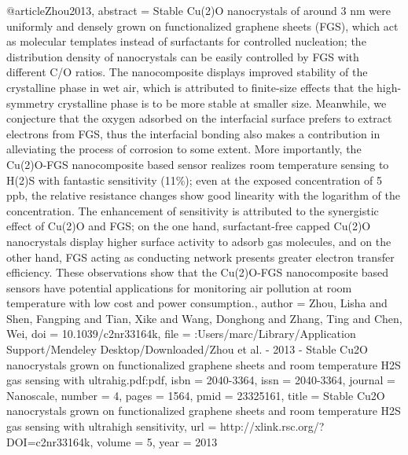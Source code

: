 @article{Zhou2013,
abstract = {Stable Cu(2)O nanocrystals of around 3 nm were uniformly and densely grown on functionalized graphene sheets (FGS), which act as molecular templates instead of surfactants for controlled nucleation; the distribution density of nanocrystals can be easily controlled by FGS with different C/O ratios. The nanocomposite displays improved stability of the crystalline phase in wet air, which is attributed to finite-size effects that the high-symmetry crystalline phase is to be more stable at smaller size. Meanwhile, we conjecture that the oxygen adsorbed on the interfacial surface prefers to extract electrons from FGS, thus the interfacial bonding also makes a contribution in alleviating the process of corrosion to some extent. More importantly, the Cu(2)O-FGS nanocomposite based sensor realizes room temperature sensing to H(2)S with fantastic sensitivity (11{\%}); even at the exposed concentration of 5 ppb, the relative resistance changes show good linearity with the logarithm of the concentration. The enhancement of sensitivity is attributed to the synergistic effect of Cu(2)O and FGS; on the one hand, surfactant-free capped Cu(2)O nanocrystals display higher surface activity to adsorb gas molecules, and on the other hand, FGS acting as conducting network presents greater electron transfer efficiency. These observations show that the Cu(2)O-FGS nanocomposite based sensors have potential applications for monitoring air pollution at room temperature with low cost and power consumption.},
author = {Zhou, Lisha and Shen, Fangping and Tian, Xike and Wang, Donghong and Zhang, Ting and Chen, Wei},
doi = {10.1039/c2nr33164k},
file = {:Users/marc/Library/Application Support/Mendeley Desktop/Downloaded/Zhou et al. - 2013 - Stable Cu2O nanocrystals grown on functionalized graphene sheets and room temperature H2S gas sensing with ultrahig.pdf:pdf},
isbn = {2040-3364},
issn = {2040-3364},
journal = {Nanoscale},
number = {4},
pages = {1564},
pmid = {23325161},
title = {{Stable Cu2O nanocrystals grown on functionalized graphene sheets and room temperature H2S gas sensing with ultrahigh sensitivity}},
url = {http://xlink.rsc.org/?DOI=c2nr33164k},
volume = {5},
year = {2013}
}
